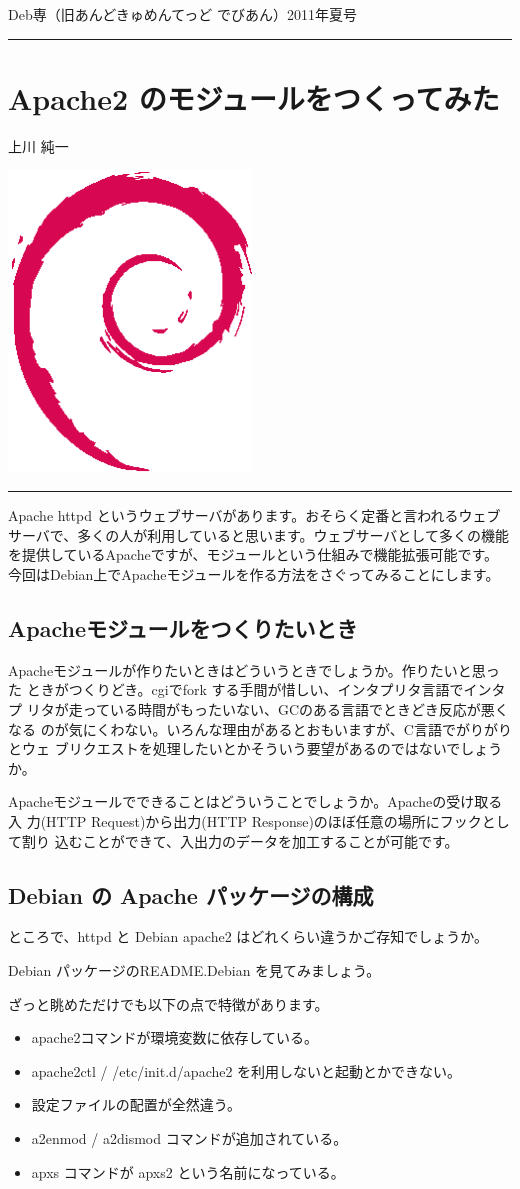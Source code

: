 \documentclass[mingoth,a4paper]{jsarticle}
\renewcommand{\dancersection}[2]{%
\newpage
Deb専（旧あんどきゅめんてっど でびあん）2011年夏号
%
\vspace{0.1mm}\\
{\color{dancerdarkblue}\rule{\hsize}{2mm}}

%
%
\begin{minipage}[t]{0.6\hsize}
\color{dancerdarkblue}
\vspace{1cm}
\section{#1}
\hfill{}#2\\
\end{minipage}
\begin{minipage}[t]{0.4\hsize}
\vspace{-2cm}
\hfill{}\includegraphics[height=8cm]{image200502/openlogo-nd.eps}\\
\vspace{-5cm}
\end{minipage}
%
{\color{dancerlightblue}\rule{0.66\hsize}{2mm}}
%
\vspace{2cm}
}
\begin{document}
\dancersection{Apache2 のモジュールをつくってみた}{上川 純一}

Apache httpd というウェブサーバがあります。おそらく定番と言われるウェブ
サーバで、多くの人が利用していると思います。ウェブサーバとして多くの機能
を提供しているApacheですが、モジュールという仕組みで機能拡張可能です。
今回はDebian上でApacheモジュールを作る方法をさぐってみることにします。

\subsection{Apacheモジュールをつくりたいとき}

Apacheモジュールが作りたいときはどういうときでしょうか。作りたいと思った
ときがつくりどき。cgiでfork する手間が惜しい、インタプリタ言語でインタプ
リタが走っている時間がもったいない、GCのある言語でときどき反応が悪くなる
のが気にくわない。いろんな理由があるとおもいますが、C言語でがりがりとウェ
ブリクエストを処理したいとかそういう要望があるのではないでしょうか。

Apacheモジュールでできることはどういうことでしょうか。Apacheの受け取る入
力(HTTP Request)から出力(HTTP Response)のほぼ任意の場所にフックとして割り
込むことができて、入出力のデータを加工することが可能です。

\subsection{Debian の Apache パッケージの構成}

ところで、httpd と Debian apache2 はどれくらい違うかご存知でしょうか。

Debian パッケージのREADME.Debian を見てみましょう。
\cite{Apache2ReadmeDebian}

ざっと眺めただけでも以下の点で特徴があります。

\begin{itemize}
 \item  apache2コマンドが環境変数に依存している。
 \item  apache2ctl / /etc/init.d/apache2 を利用しないと起動とかできない。
 \item  設定ファイルの配置が全然違う。
 \item  a2enmod / a2dismod コマンドが追加されている。
 \item  apxs コマンドが apxs2 という名前になっている。
\end{itemize}
\end{document}
